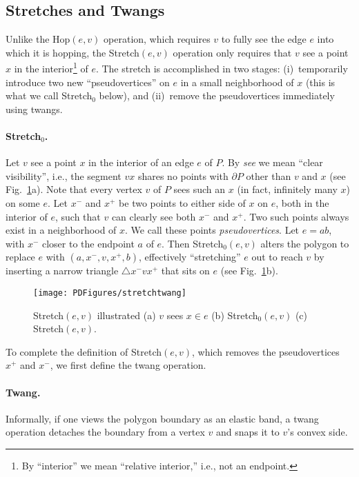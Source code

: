 \pdfoutput=1  \documentclass{article}
\def\st{{\sc Stretch}}
\def\hp{{\sc Hop}}
\def\tw{{\sc Twang}}
\newcommand{\figlab}[1]{\label{fig:#1}}
\newcommand{\seclab}[1]{\label{sec:#1}}
\newcommand{\figref}[1]{\ref{fig:#1}}
\begin{document}
\subsection{Stretches and Twangs}
\seclab{Stretches.Twangs}

Unlike the \hp$(e, v)$ operation, which requires $v$ to fully see
the edge $e$ into which it is hopping, the \st$(e, v)$ operation
only requires that $v$ see a point $x$ in the interior\footnote{
   By ``interior'' we mean ``relative interior,''
   i.e., not an endpoint.} of $e$.
The stretch is accomplished in two stages: (i)~temporarily
introduce two new ``pseudovertices'' on $e$ in a small neighborhood
of $x$ (this is what we call \st$_0$ below), and (ii)~remove the
pseudovertices immediately using twangs.

\paragraph{\st$_0$.}
Let $v$ see a point $x$ in the interior of an edge $e$ of $P$. By
\emph{see} we mean ``clear visibility'', i.e., the segment $vx$
shares no points with $\partial P$ other than $v$ and $x$ (see
Fig.~\ref{fig:stretch.twang}a). Note that every vertex $v$ of $P$
sees such an $x$ (in fact, infinitely many $x$) on some $e$.
Let $x^-$ and $x^+$ be two points to either side of $x$ on $e$,
both in the interior of $e$,
such that $v$ can clearly see both $x^-$ and $x^+$.
Two such points always exist in a
neighborhood of $x$. We call these points \emph{pseudovertices}. Let
$e=ab$, with $x^-$ closer to the endpoint $a$ of $e$. Then
\st$_0(e,v)$ alters the polygon to replace $e$ with $(a, x^-, v,
x^+, b)$, effectively ``stretching'' $e$ out to reach $v$ by
inserting a narrow triangle $\triangle x^- v x^+$ that
sits on $e$ (see Fig.~\figref{stretch.twang}b).

\begin{figure}[htbp]
\centering
\texttt{[image: PDFigures/stretchtwang]}
\caption{\st$(e, v)$ illustrated (a) $v$ sees $x \in e$ (b)
\st$_0(e,v)$ (c) \st$(e,v)$. } \figlab{stretch.twang}
\end{figure}
To complete the definition of \st$(e,v)$, which
removes the pseudovertices $x^+$ and $x^-$, we first define the twang operation.

\vspace{-0.5em}
\paragraph{\tw.}
Informally, if one views the polygon boundary as an elastic band, a
twang operation detaches the boundary from a vertex $v$ and snaps it
to $v$'s convex side. 
\end{document}
